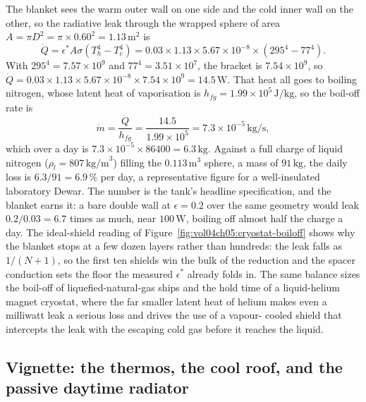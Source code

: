 The blanket sees the warm outer wall on one side and the cold inner wall on
the other, so the radiative leak through the wrapped sphere of area $A =
\pi D^2 = \pi\times0.60^2 = 1.13\,\text{m}^2$ is
\[
\dot{Q} = \epsilon^* A \sigma (T_h^4 - T_c^4) = 0.03\times1.13\times5.67
\times10^{-8}\times(295^4 - 77^4).
\]
With $295^4 = 7.57\times10^9$ and $77^4 = 3.51\times10^7$, the bracket is
$7.54\times10^9$, so $\dot{Q} = 0.03\times1.13\times5.67\times10^{-8}\times
7.54\times10^9 = 14.5\,\text{W}$. That heat all goes to boiling nitrogen,
whose latent heat of vaporisation is $h_{fg} = 1.99\times10^5\,\text{J}/
\text{kg}$, so the boil-off rate is
\[
\dot{m} = \frac{\dot{Q}}{h_{fg}} = \frac{14.5}{1.99\times10^5} = 7.3\times
10^{-5}\,\text{kg/s},
\]
which over a day is $7.3\times10^{-5}\times86400 = 6.3\,\text{kg}$. Against a
full charge of liquid nitrogen ($\rho_l = 807\,\text{kg/m}^3$) filling the
$0.113\,\text{m}^3$ sphere, a mass of $91\,\text{kg}$, the daily loss is
$6.3/91 = 6.9\,\%$ per day, a representative figure for a well-insulated
laboratory Dewar. The number is the tank's headline specification, and the
blanket earns it: a bare double wall at $\epsilon = 0.2$ over the same
geometry would leak $0.2/0.03 = 6.7$ times as much, near $100\,\text{W}$,
boiling off almost half the charge a day. The ideal-shield reading of
Figure~\ref{fig:vol04ch05:cryostat-boiloff} shows why the blanket stops at a
few dozen layers rather than hundreds: the leak falls as $1/(N+1)$, so the
first ten shields win the bulk of the reduction and the spacer conduction sets
the floor the measured $\epsilon^*$ already folds in. The same balance sizes
the boil-off of liquefied-natural-gas ships and the hold time of a
liquid-helium magnet cryostat, where the far smaller latent heat of helium
makes even a milliwatt leak a serious loss and drives the use of a vapour-
cooled shield that intercepts the leak with the escaping cold gas before it
reaches the liquid.



\subsection{Vignette: the thermos, the cool roof, and the passive daytime
radiator}

